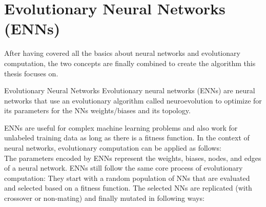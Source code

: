 \section{Evolutionary Neural Networks (ENNs)}\label{sec:evolutionary-neural-networks-(enns)}
After having covered all the basics about neural networks and evolutionary computation, the two concepts are finally combined to create the algorithm this thesis focuses on.
\begin{mydef}{Evolutionary Neural Networks}
    Evolutionary neural networks (ENNs) are neural networks that use an evolutionary algorithm called neuroevolution to optimize for its parameters for the NNs weights/biases and its topology.\cite{enn22, neuroevolution19}
\end{mydef}
ENNs are useful for complex machine learning problems and also work for unlabeled training data as long as there is a fitness function.
In the context of neural networks, evolutionary computation can be applied as follows:
\\
The parameters encoded by ENNs represent the weights, biases, nodes, and edges of a neural network.
ENNs still follow the same core process of evolutionary computation:
They start with a random population of NNs that are evaluated and selected based on a fitness function.
The selected NNs are replicated (with crossover or non-mating) and finally mutated in following ways:
